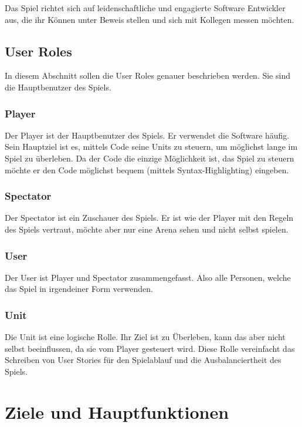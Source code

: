 \documentclass[11pt,a4paper]{scrartcl}
\let\oldsection\section
\renewcommand\section{\clearpage\oldsection}
\begin{document}
Das Spiel richtet sich auf leidenschaftliche und engagierte Software Entwickler aus, die ihr Können unter Beweis stellen und sich mit Kollegen messen möchten.

\subsection{User Roles}
In diesem Abschnitt sollen die User Roles genauer beschrieben werden. Sie sind die Hauptbenutzer des Spiels.
\subsubsection{Player}
Der Player ist der Hauptbenutzer des Spiels. Er verwendet die Software häufig. Sein Hauptziel ist es, mittels Code seine Units zu steuern, um möglichst lange im Spiel zu überleben. Da der Code die einzige Möglichkeit ist, das Spiel zu steuern möchte er den Code möglichst bequem (mittels Syntax-Highlighting) eingeben.
\subsubsection{Spectator}
Der Spectator ist ein Zuschauer des Spiels. Er ist wie der Player mit den Regeln des Spiels vertraut, möchte aber nur eine Arena sehen und nicht selbst spielen.
\subsubsection{User}
Der User ist Player und Spectator zusammengefasst. Also alle Personen, welche das Spiel in irgendeiner Form verwenden.
\subsubsection{Unit}
Die Unit ist eine logische Rolle. Ihr Ziel ist zu Überleben, kann das aber nicht selbst beeinflussen, da sie vom Player gesteuert wird. Diese Rolle vereinfacht das Schreiben von User Stories für den Spielablauf und die Ausbalanciertheit des Spiels.

\section{Ziele und Hauptfunktionen}
\end{document}
